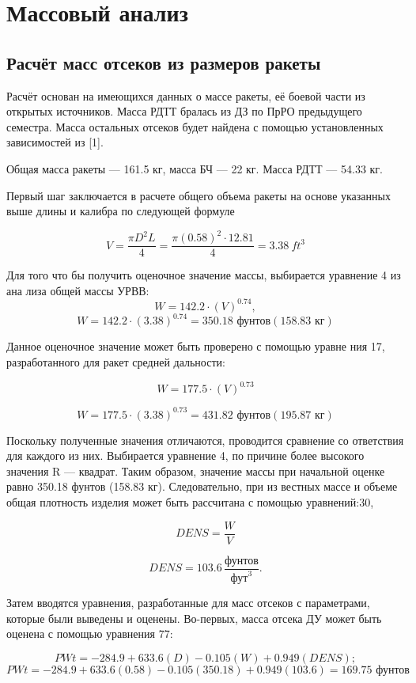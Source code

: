 \documentclass[a4paper,12pt]{report}
\begin{document}
\chapter{Массовый анализ}
\section{Расчёт масс отсеков из размеров ракеты}
Расчёт основан на имеющихся данных о массе ракеты, её боевой части из открытых источников. Масса РДТТ бралась из ДЗ по ПрРО предыдущего семестра. Масса остальных отсеков будет найдена
с помощью установленных зависимостей из [1].

Общая масса ракеты — 161.5 кг, масса БЧ — 22 кг. Масса РДТТ — 54.33 кг.

Первый шаг заключается в расчете общего объема ракеты на основе
указанных выше длины и калибра по следующей формуле

\[V = \frac{\pi D^2 L}{4} = \frac{\pi (0.58)^2 \cdot 12.81}{4} = \SI{3.38}{ft^3}\]

Для того что
бы получить оценочное значение массы, выбирается уравнение 4 из ана
лиза общей массы УРВВ:
\[W = 142.2\cdot(V)^{0.74},\]
\[W = 142.2 \cdot (3.38)^{0.74} = 350.18\text{ фунтов}(158.83\text{ кг})\] 

Данное оценочное значение может быть проверено с помощью уравне
ния 17, разработанного для ракет средней дальности:

\[ W = 177.5\cdot(V)^{0.73} \]

\[ W = 177.5\cdot(3.38)^{0.73} = 431.82 \text{ фунтов}(195.87\text{ кг}) \]

 Поскольку полученные значения отличаются, проводится сравнение со
ответствия для каждого из них. Выбирается уравнение 4, по причине более высокого значения R — квадрат. Таким образом, значение массы при
 начальной оценке равно 350.18 фунтов (158.83 кг). Следовательно, при из
вестных массе и объеме общая плотность изделия может быть рассчитана
 с помощью уравнений:30,


\[ \textit{DENS} = \frac{\textit{W}}{\textit{V}} \]

\[ \textit{DENS} = 103.6 \, \frac{\text{фунтов}}{\text{фут}^3} . \]

Затем вводятся уравнения, разработанные для масс отсеков с параметрами, которые были выведены и оценены. Во-первых, масса отсека ДУ
может быть оценена с помощью уравнения 77:

\[ \textit{PWt} = -284.9 + 633.6(D) - 0.105(W) + 0.949(\textit{DENS}); \]
\[ \textit{PWt} = -284.9 + 633.6(0.58) - 0.105(350.18) + 0.949(103.6) = 169.75 \text{ фунтов}\]
\end{document}
